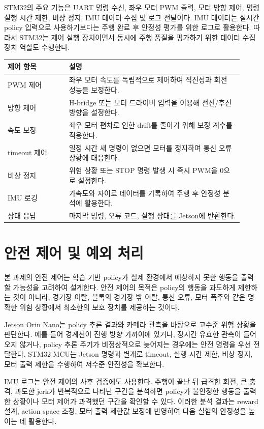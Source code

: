 \documentclass[titlepage]{pnureport}
\begin{document}
STM32의 주요 기능은 UART 명령 수신, 좌우 모터 PWM 출력, 모터 방향 제어, 명령 실행 시간 제한, 비상 정지, IMU 데이터 수집 및 로그 전달이다. IMU 데이터는 실시간 policy 입력으로 사용하기보다는 주행 완료 후 안정성 평가를 위한 로그로 활용한다. 따라서 STM32는 제어 실행 장치이면서 동시에 주행 품질을 평가하기 위한 데이터 수집 장치 역할도 수행한다.

\begin{longtable}{p{0.24\linewidth}p{0.68\linewidth}}
\toprule
제어 항목 & 설명 \\
\midrule
\endhead
PWM 제어 & 좌우 모터 속도를 독립적으로 제어하여 직진성과 회전 성능을 보정한다. \\
방향 제어 & H-bridge 또는 모터 드라이버 입력을 이용해 전진/후진 방향을 설정한다. \\
속도 보정 & 좌우 모터 편차로 인한 drift를 줄이기 위해 보정 계수를 적용한다. \\
timeout 제어 & 일정 시간 새 명령이 없으면 모터를 정지하여 통신 오류 상황에 대응한다. \\
비상 정지 & 위험 상황 또는 STOP 명령 발생 시 즉시 PWM을 0으로 설정한다. \\
IMU 로깅 & 가속도와 자이로 데이터를 기록하여 주행 후 안정성 분석에 활용한다. \\
상태 응답 & 마지막 명령, 오류 코드, 실행 상태를 Jetson에 반환한다. \\
\bottomrule
\end{longtable}

\section{안전 제어 및 예외 처리}

본 과제의 안전 제어는 학습 기반 policy가 실제 환경에서 예상하지 못한 행동을 출력할 가능성을 고려하여 설계한다. 안전 제어의 목적은 policy의 행동을 과도하게 제한하는 것이 아니라, 경기장 이탈, 블록의 경기장 밖 이탈, 통신 오류, 모터 폭주와 같은 명확한 위험 상황에서 최소한의 보호 장치를 제공하는 것이다.

Jetson Orin Nano는 policy 추론 결과와 카메라 관측을 바탕으로 고수준 위험 상황을 판단한다. 예를 들어 경계선이 진행 방향 가까이에 있거나, 장시간 유효한 관측이 들어오지 않거나, policy 추론 주기가 비정상적으로 늦어지는 경우에는 안전 명령을 우선 전달한다. STM32 MCU는 Jetson 명령과 별개로 timeout, 실행 시간 제한, 비상 정지, 모터 출력 제한을 수행하여 저수준 안전성을 확보한다.

IMU 로그는 안전 제어의 사후 검증에도 사용한다. 주행이 끝난 뒤 급격한 회전, 큰 충격, 과도한 jerk가 반복적으로 나타난 구간을 분석하면 policy가 불안정한 행동을 출력한 상황이나 모터 제어가 과격했던 구간을 확인할 수 있다. 이러한 분석 결과는 reward 설계, action space 조정, 모터 출력 제한값 보정에 반영하여 다음 실험의 안정성을 높이는 데 활용한다.
\end{document}
